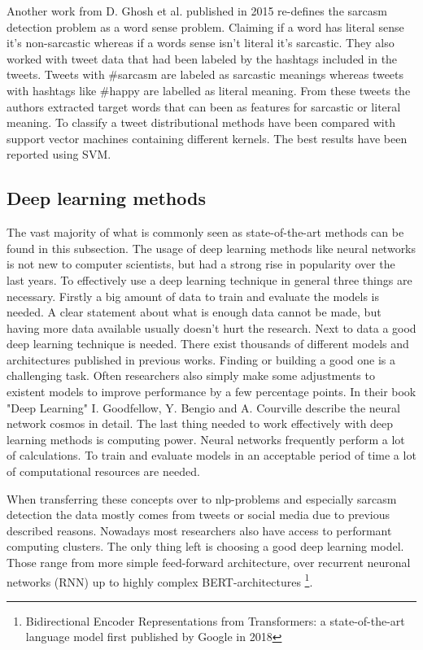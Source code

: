 \documentclass[sigconf,  review=false, nonacm=true]{acmart}
\begin{document}
Another work from D. Ghosh et al. published in 2015 \cite{Sarcastic-or-Not} re-defines the sarcasm detection problem as a word sense problem. Claiming if a word has literal sense it's non-sarcastic whereas if a words sense isn't literal it's sarcastic. They also worked with tweet data that had been labeled by the hashtags included in the tweets. Tweets with \#sarcasm are labeled as sarcastic meanings whereas tweets with hashtags like \#happy are labelled as literal meaning. From these tweets the authors extracted target words that can been as features for sarcastic or literal meaning. To classify a tweet distributional methods have been compared with support vector machines containing different kernels. The best results have been reported using SVM. 


\subsection{Deep learning methods}

The vast majority of what is commonly seen as state-of-the-art methods can be found in this subsection. The usage of deep learning methods like neural networks is not new to computer scientists, but had a strong rise in popularity over the last years.
To effectively use a deep learning technique in general three things are necessary. Firstly a big amount of data to train and evaluate the models is needed. A clear statement about what is enough data cannot be made, but having more data available usually doesn't hurt the research.
Next to data a good deep learning technique is needed. There exist thousands of different models and architectures published in previous works. Finding or building a good one is a challenging task. Often researchers also simply make some adjustments to existent models to improve performance by a few percentage points. In their book "Deep Learning" I. Goodfellow, Y. Bengio and A. Courville \cite{goodfellow2016deep} describe the neural network cosmos in detail. 
The last thing needed to work effectively with deep learning methods is computing power. Neural networks frequently perform a lot of calculations. To train and evaluate models in an acceptable period of time a lot of computational resources are needed.

When transferring these concepts over to nlp-problems and especially sarcasm detection the data mostly comes from tweets or social media due to previous described reasons. Nowadays most researchers also have access to performant computing clusters. The only thing left is choosing a good deep learning model. Those range from more simple feed-forward architecture, over recurrent neuronal networks (RNN) up to highly complex BERT-architectures \footnote{Bidirectional Encoder Representations from Transformers: a state-of-the-art language model first published by Google in 2018}.
\end{document}
